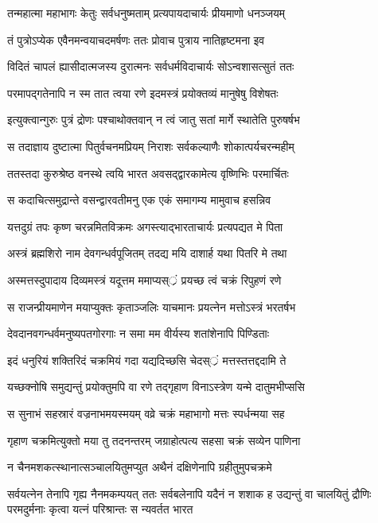 \twolineshloka
{तन्महात्मा महाभागः केतुः सर्वधनुष्मताम्}
{प्रत्यपायदाचार्यः प्रीयमाणो धनञ्जयम्}


\twolineshloka
{तं पुत्रोऽप्येक एवैनमन्वयाचदमर्षणः}
{ततः प्रोवाच पुत्राय नातिहृष्टमना इव}


\twolineshloka
{विदितं चापलं ह्यासीदात्मजस्य दुरात्मनः}
{सर्वधर्मविदाचार्यः सोऽन्वशासत्सुतं ततः}


\twolineshloka
{परमापद्गतेनापि न स्म तात त्वया रणे}
{इदमस्त्रं प्रयोक्तव्यं मानुषेषु विशेषतः}


\twolineshloka
{इत्युक्त्वान्गुरुः पुत्रं द्रोणः पश्चाथोक्तवान्}
{न त्वं जातु सतां मार्गे स्थातेति पुरुषर्षभ}


\twolineshloka
{स तदाज्ञाय दुष्टात्मा पितुर्वचनमप्रियम्}
{निराशः सर्वकल्याणैः शोकात्पर्यचरन्महीम्}


\twolineshloka
{ततस्तदा कुरुश्रेष्ठ वनस्थे त्वयि भारत}
{अवसद्द्वारकामेत्य वृष्णिभिः परमार्चितः}


\twolineshloka
{स कदाचित्समुद्रान्ते वसन्द्वारवतीमनु}
{एक एकं समागम्य मामुवाच हसन्निव}


\twolineshloka
{यत्तदुग्रं तपः कृष्ण चरन्नमितविक्रमः}
{अगस्त्याद्भारताचार्यः प्रत्यपद्यत मे पिता}


\twolineshloka
{अस्त्रं ब्रह्मशिरो नाम देवगन्धर्वपूजितम्}
{तदद्य मयि दाशार्ह यथा पितरि मे तथा}


\twolineshloka
{अस्मत्तस्दुपादाय दिव्यमस्त्रं यदूत्तम}
{ममाप्यस््रं प्रयच्छ त्वं चक्रं रिपुहणं रणे}


\twolineshloka
{स राजन्प्रीयमाणेन मयाप्युक्तः कृताञ्जलिः}
{याचमानः प्रयत्नेन मत्तोऽस्त्रं भरतर्षभ}


\twolineshloka
{देवदानवगन्धर्वमनुष्यपतगोरगाः}
{न समा मम वीर्यस्य शतांशेनापि पिण्डिताः}


\twolineshloka
{इदं धनुरियं शक्तिरिदं चक्रमियं गदा}
{यद्यदिच्छसि चेदस््रं मत्तस्तत्तद्ददामि ते}


\twolineshloka
{यच्छक्नोषि समुद्यन्तुं प्रयोक्तुमपि वा रणे}
{तद्गृहाण विनाऽस्त्रेण यन्मे दातुमभीप्ससि}


\twolineshloka
{स सुनाभं सहस्रारं वज्रनाभमयस्मयम्}
{वव्रे चक्रं महाभागो मत्तः स्पर्धन्मया सह}


\twolineshloka
{गृहाण चक्रमित्युक्तो मया तु तदनन्तरम्}
{जग्राहोत्पत्य सहसा चक्रं सव्येन पाणिना}


\twolineshloka
{न चैनमशकत्स्थानात्सञ्चालयितुमप्युत}
{अथैनं दक्षिणेनापि ग्रहीतुमुपचक्रमे}


सर्वयत्नेन तेनापि गृह्य नैनमकम्पयत्
\threelineshloka
{ततः सर्वबलेनापि यदैनं न शशाक ह}
{उद्यन्तुं वा चालयितुं द्रौणिः परमदुर्मनाः}
{कृत्वा यत्नं परिश्रान्तः स न्यवर्तत भारत}


